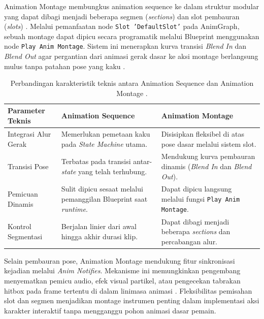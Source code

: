 \documentclass[a4paper,oneside,12pt]{report}
\begin{document}
Animation Montage membungkus animation sequence ke dalam struktur modular yang dapat dibagi menjadi beberapa segmen (\textit{sections}) dan slot pembauran (\textit{slots}) \cite{epic-montage}. Melalui pemanfaatan node \texttt{Slot 'DefaultSlot'} pada AnimGraph, sebuah montage dapat dipicu secara programatik melalui Blueprint menggunakan node \texttt{Play Anim Montage}. Sistem ini menerapkan kurva transisi \textit{Blend In} dan \textit{Blend Out} agar pergantian dari animasi gerak dasar ke aksi montage berlangsung mulus tanpa patahan pose yang kaku \cite{epic-montage}.

\begin{table}[H]
	\centering
	\renewcommand{\arraystretch}{1.25}
	\caption{Perbandingan karakteristik teknis antara Animation Sequence dan Animation Montage \cite{epic-montage,modul6}.}
	\label{tab:komparasi-sequence-montage}
	\begin{tabularx}{\linewidth}{|l|Y|Y|}
		\hline
		\textbf{Parameter Teknis} & \textbf{Animation Sequence} & \textbf{Animation Montage} \\
		\hline
		Integrasi Alur Gerak & Memerlukan pemetaan kaku pada \textit{State Machine} utama. & Disisipkan fleksibel di atas pose dasar melalui sistem slot. \\
		\hline
		Transisi Pose & Terbatas pada transisi antar-\textit{state} yang telah terhubung. & Mendukung kurva pembauran dinamis (\textit{Blend In} dan \textit{Blend Out}). \\
		\hline
		Pemicuan Dinamis & Sulit dipicu sesaat melalui pemanggilan Blueprint saat \textit{runtime}. & Dapat dipicu langsung melalui fungsi \texttt{Play Anim Montage}. \\
		\hline
		Kontrol Segmentasi & Berjalan linier dari awal hingga akhir durasi klip. & Dapat dibagi menjadi beberapa \textit{sections} dan percabangan alur. \\
		\hline
	\end{tabularx}
\end{table}


Selain pembauran pose, Animation Montage mendukung fitur sinkronisasi kejadian melalui \textit{Anim Notifies}. Mekanisme ini memungkinkan pengembang menyematkan pemicu audio, efek visual partikel, atau pengecekan tabrakan hitbox pada frame tertentu di dalam linimasa animasi \cite{epic-montage}. Fleksibilitas pemisahan slot dan segmen menjadikan montage instrumen penting dalam implementasi aksi karakter interaktif tanpa mengganggu pohon animasi dasar pemain.

\clearpage
\end{document}
